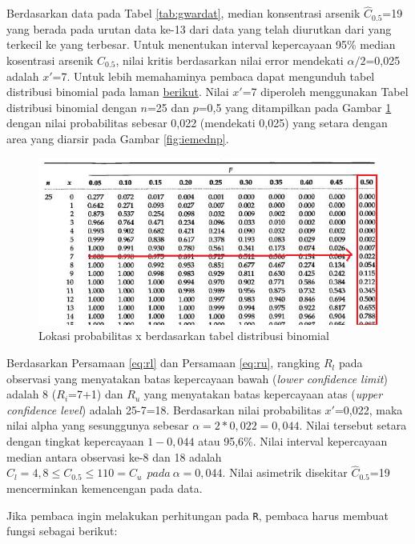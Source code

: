 \documentclass[]{book}
\begin{document}
Berdasarkan data pada Tabel \ref{tab:gwardat}, median konsentrasi
arsenik \(\hat{C}_{0.5}\)=19 yang berada pada urutan data ke-13 dari
data yang telah diurutkan dari yang terkecil ke yang terbesar. Untuk
menentukan interval kepercayaan 95\% median kosentrasi arsenik
\(C_{0.5}\), nilai kritis berdasarkan nilai error mendekati
\(\alpha/2\)=0,025 adalah \(x'\)=7. Untuk lebih memahaminya pembaca
dapat mengunduh tabel distribusi binomial pada laman
\href{https://onlinepubs.trb.org/onlinepubs/nchrp/cd-22/manual/v2appendixc.pdf}{berikut}.
Nilai \(x'\)=7 diperoleh menggunakan Tabel distribusi binomial dengan
\(n\)=25 dan \(p\)=0,5 yang ditampilkan pada Gambar \ref{fig:tabbinom}
dengan nilai probabilitas sebesar 0,022 (mendekati 0,025) yang setara
dengan area yang diarsir pada Gambar \ref{fig:iemednp}.

\begin{figure}

{\centering \includegraphics[width=0.65\linewidth]{tabbinom} 

}

\caption{Lokasi probabilitas x berdasarkan tabel distribusi binomial}\label{fig:tabbinom}
\end{figure}

Berdasarkan Persamaan \eqref{eq:rl} dan Persamaan \eqref{eq:ru}, rangking
\(R_l\) pada observasi yang menyatakan batas kepercayaan bawah
(\emph{lower confidence limit}) adalah 8 (\(R_i\)=7+1) dan \(R_u\) yang
menyatakan batas kepercayaan atas (\emph{upper confidence level}) adalah
25-7=18. Berdasarkan nilai probabilitas \(x'\)=0,022, maka nilai alpha
yang sesunggunya sebesar \(\alpha=2*0,022=0,044\). Nilai tersebut setara
dengan tingkat kepercayaan \(1-0,044\) atau 95,6\%. Nilai interval
kepercayaan median antara observasi ke-8 dan 18 adalah
\(C_l=4,8\le C_{0.5}\le110=C_u\ \ pada\ \alpha=0,044\). Nilai asimetrik
disekitar \(\hat{C}_{0.5}\)=19 mencerminkan kemencengan pada data.

Jika pembaca ingin melakukan perhitungan pada \texttt{R}, pembaca harus
membuat fungsi sebagai berikut:
\end{document}
